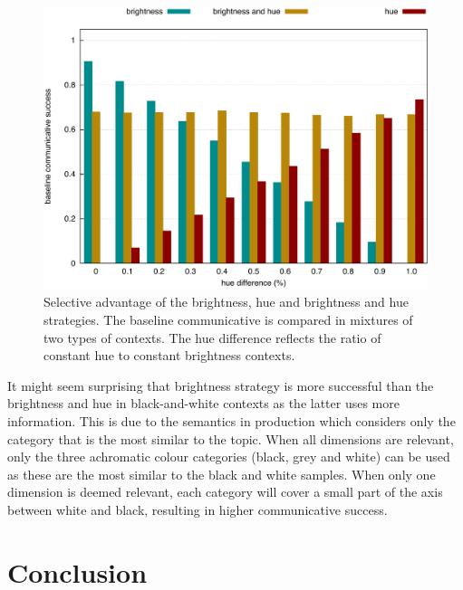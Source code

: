 \begin{figure}[htbp]
\begin{center}
  \includegraphics[width=.8\textwidth]{./selection/figures/selective-advantage.pdf}
\end{center}
\caption[Selective advantage of basic colour strategies]{Selective
  advantage of the brightness, hue and brightness and
  hue strategies. The baseline communicative is compared in
  mixtures of two types of contexts. The hue difference reflects the
  ratio of constant hue to constant brightness contexts.}
\label{f:ls-selective-advantage}
\end{figure}

It might seem surprising that brightness strategy is more
successful than the brightness and hue in black-and-white
contexts as the latter uses more information. This is due to the
semantics in production which considers only the category that is the
most similar to the topic. When all dimensions are relevant, only the
three achromatic colour categories (black, grey and white) can be used
as these are the most similar to the black and white samples. When
only one dimension is deemed relevant, each category will cover a
small part of the axis between white and black, resulting in higher
communicative success.

\section{Conclusion}
\label{s:ls-conclusions}

